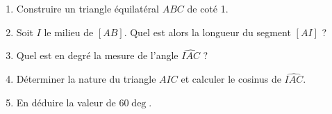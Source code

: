 
\begin{enumerate}
\item Construire un triangle équilatéral $ABC$ de coté 1.
\item Soit $I$ le milieu de $[AB]$. Quel est alors la longueur du segment $[AI]$ ?
\item Quel est en degré la mesure de l'angle $\widehat{IAC}$ ?
\item Déterminer la nature du triangle $AIC$ et calculer le cosinus de $\widehat{IAC}$.
\item En déduire la valeur de $60\deg$.
\end{enumerate}